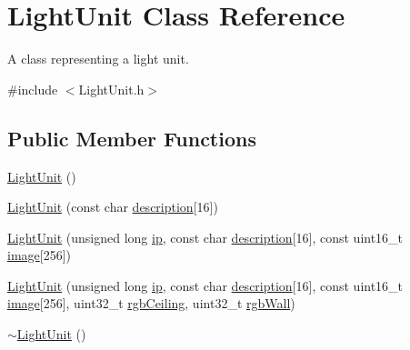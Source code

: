 \hypertarget{classLightUnit}{}\section{Light\+Unit Class Reference}
\label{classLightUnit}


A class representing a light unit.  




{\ttfamily \#include $<$Light\+Unit.\+h$>$}

\subsection*{Public Member Functions}
\begin{DoxyCompactItemize}
\item 
\mbox{\hyperlink{classLightUnit_a28169090402e0a891c35a881760e14bd}{Light\+Unit}} ()
\item 
\mbox{\hyperlink{classLightUnit_aa44c2d7b6e764c9bbca0f5ab19a31553}{Light\+Unit}} (const char \mbox{\hyperlink{classLightUnit_aad36ad5ba65b93a30ee35ef1f6895b5a}{description}}\mbox{[}16\mbox{]})
\item 
\mbox{\hyperlink{classLightUnit_afb696351f25e3766eb18d6ce31f97fa6}{Light\+Unit}} (unsigned long \mbox{\hyperlink{classLightUnit_a7d490bbccb134d200628eee46ab8fb3d}{ip}}, const char \mbox{\hyperlink{classLightUnit_aad36ad5ba65b93a30ee35ef1f6895b5a}{description}}\mbox{[}16\mbox{]}, const uint16\+\_\+t \mbox{\hyperlink{classLightUnit_a01f65fda0c55ecd8b1d62911cfa688d2}{image}}\mbox{[}256\mbox{]})
\item 
\mbox{\hyperlink{classLightUnit_ab91f948d033d6982b4b981aea104b1d7}{Light\+Unit}} (unsigned long \mbox{\hyperlink{classLightUnit_a7d490bbccb134d200628eee46ab8fb3d}{ip}}, const char \mbox{\hyperlink{classLightUnit_aad36ad5ba65b93a30ee35ef1f6895b5a}{description}}\mbox{[}16\mbox{]}, const uint16\+\_\+t \mbox{\hyperlink{classLightUnit_a01f65fda0c55ecd8b1d62911cfa688d2}{image}}\mbox{[}256\mbox{]}, uint32\+\_\+t \mbox{\hyperlink{classLightUnit_ae688f610193b69a2f390bd2a44dc2a7c}{rgb\+Ceiling}}, uint32\+\_\+t \mbox{\hyperlink{classLightUnit_a9927e4bcf968e043883688e87935fb4a}{rgb\+Wall}})
\item 
\mbox{\hyperlink{classLightUnit_a29969943be7a664ffc0795ec07cc12c2}{$\sim$\+Light\+Unit}} ()
\end{DoxyCompactItemize}
